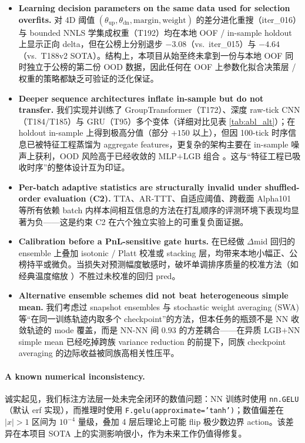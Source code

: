 \documentclass[11pt]{article}
\begin{document}
\begin{itemize}
  \item \textbf{Learning decision parameters on the same data used for selection overfits.} 对 4D 阈值 $(\theta_{\text{up}}, \theta_{\text{dn}}, \mathrm{margin}, \mathrm{weight})$ 的差分进化重搜（iter\_016）与 bounded NNLS 学集成权重（T192）均在本地 OOF / in-sample holdout 上显示正向 delta，但在公榜上分别退步 $-3.08$（vs.\ iter\_015）与 $-4.64$（vs.\ T188v2 SOTA）。结构上，本项目从始至终未拿到一份与本地 OOF 同时独立于公榜的第二份 OOD 数据，因此任何在 OOF 上参数化拟合决策层 / 权重的策略都缺乏可验证的泛化保证。
  \item \textbf{Deeper sequence architectures inflate in-sample but do not transfer.} 我们实现并训练了 GroupTransformer（T172）、深度 raw-tick CNN（T184/T185）与 GRU（T95）多个变体（详细对比见表 \ref{tab:abl_alt}）；在 holdout in-sample 上得到极高分值（部分 $+150$ 以上），但因 100-tick 时序信息已被特征工程蒸馏为 aggregate features，更复杂的架构主要在 in-sample 噪声上获利，OOD 风险高于已经收敛的 MLP$+$LGB 组合 \cite{translob,tabl_ctabl,ft_transformer,tlob_mlplob}。这与``特征工程已吸收时序''的整体设计互为印证。
  \item \textbf{Per-batch adaptive statistics are structurally invalid under shuffled-order evaluation (C2).} TTA、AR-TTT、自适应阈值、跨截面 Alpha101 等所有依赖 batch 内样本间相互信息的方法在打乱顺序的评测环境下表现均显著为负——这是约束 C2 在六个独立实验上的可重复负面证据。
  \item \textbf{Calibration before a PnL-sensitive gate hurts.} 在已经做 $\Delta$mid 回归的 ensemble 上叠加 isotonic / Platt 校准或 stacking 层，均带来本地小幅正、公榜持平或微负。当损失对预测幅度敏感时，破坏单调排序质量的校准方法（如经典温度缩放 \cite{temperature_scaling}）不胜过未校准的回归 pred。
  \item \textbf{Alternative ensemble schemes did not beat heterogeneous simple mean.} 我们考虑过 snapshot ensembles \cite{snapshot_ensembles} 与 stochastic weight averaging (SWA) \cite{swa} 等``在同一训练轨迹内取多个 checkpoint''的方法，但本任务的瓶颈不是 NN 收敛轨迹的 mode 覆盖，而是 NN-NN 间 $0.93$ 的方差耦合——在异质 LGB$+$NN simple mean 已经吃掉跨族 variance reduction 的前提下，同族 checkpoint averaging 的边际收益被同族高相关性压平。
\end{itemize}

\paragraph{A known numerical inconsistency.}
诚实起见，我们标注方法层一处未完全闭环的数值问题：NN 训练时使用 \texttt{nn.GELU}（默认 erf 实现），而推理时使用 \texttt{F.gelu(approximate='tanh')}；数值偏差在 $|x|>1$ 区间为 $10^{-4}$ 量级，叠加 4 层后理论上可能 flip 极少数边界 action。该差异在本项目 SOTA 上的实测影响很小，作为未来工作仍值得修复。
\end{document}
